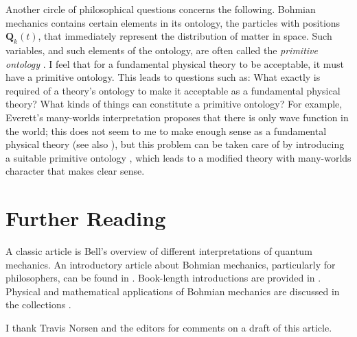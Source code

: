 \documentclass[12pt]{article}
\newcommand{\vQ}{\boldsymbol{Q}}
\begin{document}
Another circle of philosophical questions concerns the following. Bohmian mechanics contains certain elements in its ontology, the particles with positions $\vQ_k(t)$, that immediately represent the distribution of matter in space. Such variables, and such elements of the ontology, are often called the \emph{primitive ontology} \cite{DGZ92,AGTZ14,Mau16}. I feel that for a fundamental physical theory to be acceptable, it must have a primitive ontology. This leads to questions such as: What exactly is required of a theory's ontology to make it acceptable as a fundamental physical theory? What kinds of things can constitute a primitive ontology? For example, Everett's many-worlds interpretation proposes that there is only wave function in the world; this does not seem to me to make enough sense as a fundamental physical theory (see also \cite{Mau10}), but this problem can be taken care of by introducing a suitable primitive ontology \cite{AGTZ11}, which leads to a modified theory with many-worlds character that makes clear sense.


\section{Further Reading}

A classic article is Bell's \cite{Bell86b} overview of different interpretations of quantum mechanics. 
An introductory article about Bohmian mechanics, particularly for philosophers, can be found in \cite{Gol01}.
Book-length introductions are provided in \cite{DT,Bri16}. Physical and mathematical applications of Bohmian mechanics are discussed in the collections \cite{Chat,Ori}.

\bigskip

 I thank Travis Norsen and the editors for comments on a draft of this article.
\end{document}
